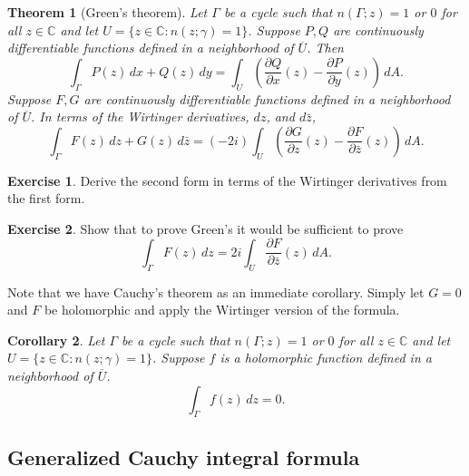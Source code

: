 \documentclass[12pt,openany]{book}
\newcommand{\C}{{\mathbb{C}}}
\theoremstyle{plain}
\newtheorem{thm}{Theorem}[section]
\newtheorem{cor}[thm]{Corollary}
\theoremstyle{remark}
\theoremstyle{definition}
\newenvironment{exbox}{%
    \def\FrameCommand{\vrule width 1pt \relax\hspace{10pt}}%
    \MakeFramed{\advance\hsize-\width\FrameRestore}%
}{%
    \endMakeFramed
}
\theoremstyle{exercise}
\newtheorem{exercise}{Exercise}[section]
\theoremstyle{example}
\begin{document}
\begin{thm}[Green's theorem] \label{thm:greens}
Let $\Gamma$ be a cycle
such that $n(\Gamma;z) = 1$ or $0$ for all $z \in \C$ and let $U = \{ z \in \C : n(z;\gamma) = 1 \}$.
Suppose 
$P,Q$ are continuously differentiable functions defined in a neighborhood
of $\overline{U}$.
Then
\begin{equation*}
\int_{\Gamma} P(z) \, dx + Q(z) \, dy
=
\int_{U}
\left(
\frac{\partial Q}{\partial x}(z)
-
\frac{\partial P}{\partial y}(z)
\right)
\, dA .
\end{equation*}
Suppose $F,G$ are continuously differentiable functions defined in a neighborhood
of $\overline{U}$.
In terms of the Wirtinger derivatives, $dz$, and $d \bar{z}$,
\begin{equation*}
\int_{\Gamma} F(z) \, dz + G(z) \, d\bar{z}
=
(-2i)
\int_{U}
\left(
\frac{\partial G}{\partial z}(z)
-
\frac{\partial F}{\partial \bar{z}}(z)
\right)
\, dA .
\end{equation*}
\end{thm}

\begin{exbox}
\begin{exercise}
Derive the second form in terms of the Wirtinger derivatives from the first
form.
\end{exercise}

\begin{exercise}
Show that to prove Green's it would be sufficient to prove
\begin{equation*}
\int_{\Gamma} F(z) \, dz
=
2i
\int_{U}
\frac{\partial F}{\partial \bar{z}}(z)
\, dA .
\end{equation*}
\end{exercise}
\end{exbox}

Note that we have Cauchy's theorem as an immediate corollary.  Simply let
$G=0$ and $F$ be holomorphic and apply the Wirtinger version of the formula.

\begin{cor}\label{thm:cauchybygreen}
Let $\Gamma$ be a cycle
such that $n(\Gamma;z) = 1$ or $0$ for all $z \in \C$ and let $U = \{ z \in \C : n(z;\gamma) = 1 \}$.
Suppose $f$ is a holomorphic function defined in a neighborhood of $\overline{U}$.
\begin{equation*}
\int_{\Gamma} f(z) \, dz  = 0.
\end{equation*}
\end{cor}

\subsection{Generalized Cauchy integral formula}
\end{document}
